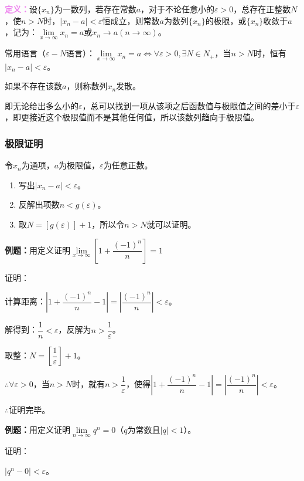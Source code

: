 \documentclass[UTF8, 12pt]{ctexart}
\begin{document}
\textcolor{violet}{\textbf{定义：}}设$\{x_n\}$为一数列，若存在常数$a$，对于不论任意小的$\varepsilon>0$，总存在正整数$N$，使$n>N$时，$\vert x_n-a\vert<\varepsilon$恒成立，则常数$a$为数列$\{x_n\}$的极限，或$\{x_n\}$收敛于$a$，记为：$\lim\limits_{x\to\infty}x_n=a$或$x_n\to a(n\to\infty)$。

常用语言（$\varepsilon-N$语言）：$\lim\limits_{x\to\infty}x_n=a\Leftrightarrow\forall\varepsilon>0,\exists N\in N_+$，当$n>N$时，恒有$\vert x_n-a\vert<\varepsilon$。

如果不存在该数$a$，则称数列$x_n$发散。

即无论给出多么小的$\varepsilon$，总可以找到一项从该项之后函数值与极限值之间的差小于$\varepsilon$，即更接近这个极限值而不是其他任何值，所以该数列趋向于极限值。

\subsubsection{极限证明}

令$x_n$为通项，$a$为极限值，$\varepsilon$为任意正数。

\begin{enumerate}
    \item 写出$\vert x_n-a|<\varepsilon$。
    \item 反解出项数$n<g(\varepsilon)$。
    \item 取$N=[g(\varepsilon)]+1$，所以令$n>N$就可以证明。
\end{enumerate}

\textbf{例题：}用定义证明$\lim\limits_{x\to\infty}\left[1+\dfrac{(-1)^n}{n}\right]=1$

证明：

计算距离：$\left\vert 1+\dfrac{(-1)^n}{n}-1\right\vert=\left\vert\dfrac{(-1)^n}{n}\right\vert<\varepsilon$。

解得到：$\dfrac{1}{n}<\varepsilon$，反解为$n>\dfrac{1}{\varepsilon}$。

取整：$N=\left[\dfrac{1}{\varepsilon}\right]+1$。

$\therefore\forall\varepsilon>0$，当$n>N$时，就有$n>\dfrac{1}{\varepsilon}$，使得$\left\vert 1+\dfrac{(-1)^n}{n}-1\right\vert=\left\vert\dfrac{(-1)^n}{n}\right\vert<\varepsilon$。

$\therefore$证明完毕。

\textbf{例题：}用定义证明$\lim\limits_{n\to\infty}q^n=0$（$q$为常数且$\vert q\vert<1$）。

证明：

$\vert q^n-0\vert<\varepsilon$。
\end{document}
